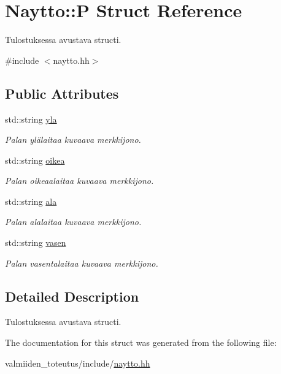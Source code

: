 \hypertarget{struct_naytto_1_1_p}{}\section{Naytto\+:\+:P Struct Reference}
\label{struct_naytto_1_1_p}


Tulostuksessa avustava structi.  




{\ttfamily \#include $<$naytto.\+hh$>$}

\subsection*{Public Attributes}
\begin{DoxyCompactItemize}
\item 
\hypertarget{struct_naytto_1_1_p_a9929ca6c2e4bdfebf350522fee0e231a}{}std\+::string \hyperlink{struct_naytto_1_1_p_a9929ca6c2e4bdfebf350522fee0e231a}{yla}\label{struct_naytto_1_1_p_a9929ca6c2e4bdfebf350522fee0e231a}

\begin{DoxyCompactList}\small\item\em Palan ylälaitaa kuvaava merkkijono. \end{DoxyCompactList}\item 
\hypertarget{struct_naytto_1_1_p_a2476e4eb9177dff801da869a9ad010b3}{}std\+::string \hyperlink{struct_naytto_1_1_p_a2476e4eb9177dff801da869a9ad010b3}{oikea}\label{struct_naytto_1_1_p_a2476e4eb9177dff801da869a9ad010b3}

\begin{DoxyCompactList}\small\item\em Palan oikeaalaitaa kuvaava merkkijono. \end{DoxyCompactList}\item 
\hypertarget{struct_naytto_1_1_p_adbf8b79806a3b296be8f2867d0ca57df}{}std\+::string \hyperlink{struct_naytto_1_1_p_adbf8b79806a3b296be8f2867d0ca57df}{ala}\label{struct_naytto_1_1_p_adbf8b79806a3b296be8f2867d0ca57df}

\begin{DoxyCompactList}\small\item\em Palan alalaitaa kuvaava merkkijono. \end{DoxyCompactList}\item 
\hypertarget{struct_naytto_1_1_p_a66fa6f2d2fa48f179636a7d6321bbd9c}{}std\+::string \hyperlink{struct_naytto_1_1_p_a66fa6f2d2fa48f179636a7d6321bbd9c}{vasen}\label{struct_naytto_1_1_p_a66fa6f2d2fa48f179636a7d6321bbd9c}

\begin{DoxyCompactList}\small\item\em Palan vasentalaitaa kuvaava merkkijono. \end{DoxyCompactList}\end{DoxyCompactItemize}


\subsection{Detailed Description}
Tulostuksessa avustava structi. 

The documentation for this struct was generated from the following file\+:\begin{DoxyCompactItemize}
\item 
valmiiden\+\_\+toteutus/include/\hyperlink{naytto_8hh}{naytto.\+hh}\end{DoxyCompactItemize}
